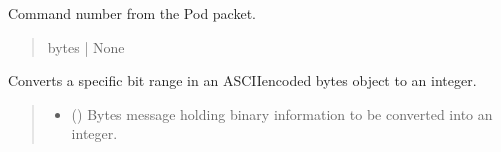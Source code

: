 \documentclass[letterpaper,10pt,english]{sphinxmanual}
\begin{document}
\begin{fulllineitems}
\begin{fulllineitems}
\begin{quote}
\begin{description}
\end{description}\end{quote}

\end{fulllineitems}


\begin{fulllineitems}
\label{\detokenize{PodApi.Packets:PodApi.Packets.Packet.Packet.commandNumber}}
\pysigstartsignatures
{}
\pysigstopsignatures
\sphinxAtStartPar
Command number from the Pod packet.
\begin{quote}\begin{description}
\sphinxAtStartPar
bytes | None

\end{description}\end{quote}

\end{fulllineitems}


\begin{fulllineitems}
\label{\detokenize{PodApi.Packets:PodApi.Packets.Packet.Packet.ASCIIbytesToInt_Split}}
\pysigstartsignatures
{}
\pysigstopsignatures
\sphinxAtStartPar
Converts a specific bit range in an ASCII\sphinxhyphen{}encoded bytes object to an integer.
\begin{quote}\begin{description}
\begin{itemize}
\item {} 
\sphinxAtStartPar
{} () \textendash{} Bytes message holding binary information to be converted into an integer.


\end{itemize}
\end{description}
\end{quote}
\end{fulllineitems}
\end{fulllineitems}
\end{document}
